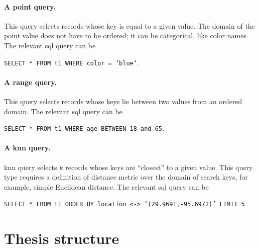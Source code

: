 			\paragraph*{A point query.}
				This query selects records whose key is equal to a given value.
				The domain of the point value does not have to be ordered; it can be categorical, like color names.
				The relevant \acrshort{sql} query can be

				\begin{center}
					\texttt{SELECT * FROM t1 WHERE color = 'blue'}. %
				\end{center}

			\paragraph*{A range query.}
				This query selects records whose keys lie between two values from an ordered domain.
				The relevant \acrshort{sql} query can be

				\begin{center}
					\texttt{SELECT * FROM t1 WHERE age BETWEEN 18 and 65}.
				\end{center}

			\paragraph*{A \acrshort{knn} query.}
				\acrlong{knn} query selects $k$ records whose keys are ``closest'' to a given value.
				This query type requires a definition of distance metric over the domain of search keys, for example, simple Euclidean distance.
				The relevant \acrshort{sql} query can be

				\begin{center}
					\texttt{SELECT * FROM t1 ORDER BY location <-> '(29.9691,-95.6972)' LIMIT 5}. %
				\end{center}

	\section{Thesis structure}

